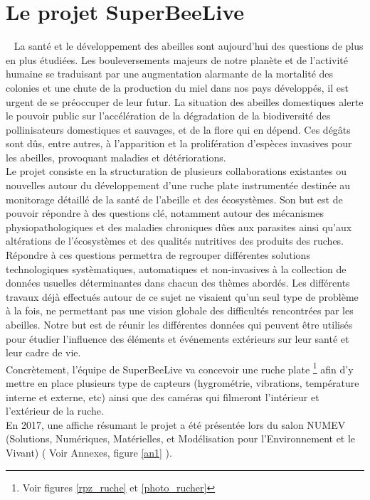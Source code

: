 \documentclass[11pt,french,a4paper]{report}
\begin{document}
\section{Le projet SuperBeeLive}
 
La santé et le développement des abeilles sont aujourd’hui des questions de plus en plus étudiées. Les bouleversements
majeurs de notre planète et de l’activité humaine se traduisant par une augmentation alarmante de la mortalité
des colonies et une chute de la production du miel dans nos pays développés, il est urgent de se préoccuper de leur futur. 
La situation des abeilles domestiques alerte le pouvoir public sur l’accélération de la dégradation de la biodiversité des 
pollinisateurs domestiques et sauvages, et de la flore qui en dépend. Ces dégâts sont dûs, entre autres, à l’apparition 
et la prolifération d’espèces invasives pour les abeilles, provoquant maladies et détériorations. \\ 

Le projet consiste en la structuration de plusieurs collaborations existantes ou nouvelles autour du développement 
d’une ruche plate instrumentée destinée au monitorage détaillé de la santé de l’abeille et des écosystèmes. Son but est de
pouvoir répondre à des questions clé, notamment autour des mécanismes physiopathologiques et des maladies chroniques 
dûes aux parasites ainsi qu’aux altérations de l’écosystèmes et des qualités nutritives des produits des ruches. \\
Répondre à ces questions permettra de regrouper différentes solutions technologiques systèmatiques, 
automatiques et non-invasives à la collection de données usuelles déterminantes dans chacun des thèmes abordés.
Les différents travaux déjà effectués autour de ce sujet ne visaient qu’un seul type de problème à la fois, 
ne permettant pas une vision globale des difficultés rencontrées par les abeilles. Notre but est de réunir les différentes
données qui peuvent être utilisés pour étudier l’influence des éléments et événements extérieurs sur leur santé et leur cadre de vie.\\

Concrètement, l'équipe de SuperBeeLive va concevoir une ruche plate \footnote{Voir figures \ref{rpz_ruche} et \ref{photo_rucher}} afin d'y mettre 
en place plusieurs type  de capteurs (hygrométrie, vibrations, température interne et externe, etc) ainsi que des caméras qui filmeront 
l'intérieur et l'extérieur de la ruche. \\
En 2017, une affiche résumant le projet a été présentée lors du salon NUMEV (Solutions, Numériques, Matérielles, et 
Modélisation pour l'Environnement et le Vivant) ( Voir Annexes, figure \ref{an1} ). \\ 
\end{document}
